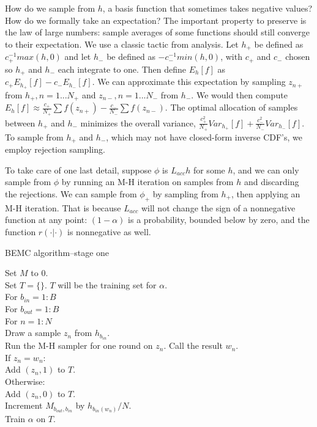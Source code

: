 \documentclass{article}
\begin{document}
How do we sample from $h$, a basis function that sometimes takes negative values? How do we formally take an expectation? The important property to preserve is the law of large numbers: sample averages of some functions should still converge to their expectation. We use a classic tactic from analysis. Let $h_+$ be defined as $c_+^{-1}max(h, 0)$ and let $h_-$ be defined as $-c_-^{-1}min(h, 0)$, with $c_+$ and $c_-$ chosen so $h_+$ and $h_-$ each integrate to one. Then define $E_{h}[f]$ as $c_+E_{h_+}[f]-c_-E_{h_-}[f]$. We can approximate this expectation by sampling $z_{n+}$ from $h_+, n=1...N_+$ and $z_{n-}, n=1...N_-$ from $h_-$. We would then compute $E_{h}[f] \approx \frac{c_+}{N_+}\sum f(z_{n+})-\frac{c_-}{N_-}\sum f(z_{n-})$. The optimal allocation of samples between $h_+$ and $h_-$ minimizes the overall variance, $\frac{c_+^2}{N_+}Var_{h_+}[f] + \frac{c_-^2}{N_-}Var_{h_-}[f]$. To sample from $h_+$ and $h_-$, which may not have closed-form inverse CDF's, we employ rejection sampling. 

To take care of one last detail, suppose $\phi$ is $L_{acc}h$ for some $h$, and we can only sample from $\phi$ by running an M-H iteration on samples from $h$ and discarding the rejections. We can sample from $\phi_+$ by sampling from $h_+$, then applying an M-H iteration. That is because $L_{acc}$ will not change the sign of a nonnegative function at any point: $(1-\alpha)$ is a probability, bounded below by zero, and the function $r(\cdot | \cdot)$ is nonnegative as well. 

\begin{algorithm}[h]
\caption{BEMC algorithm--stage one}
Set $M$ to $0$.\\
Set $T = \{\}$. $T$ will be the training set for $\alpha$.\\
For $b_{in}  = 1:B$\\
\Indp
For $b_{out}  = 1:B$\\
\Indp
For $n = 1:N$\\
\Indp
Draw a sample $z_n$ from $h_{b_{in}}$.\\
Run the M-H sampler for one round on $z_n$. Call the result $w_n$.\\
If $z_n = w_n$:\\
\Indp
Add $(z_n, 1)$ to $T$.\\
\Indm
Otherwise:\\
\Indp
Add $(z_n, 0)$ to $T$.\\
Increment $M_{b_{out}, b_{in}}$ by $h_{b_{in}(w_n)}/N$.\\
\Indm
\Indm
\Indm
Train $\alpha$ on $T$.\\
\end{algorithm}
\end{document}

